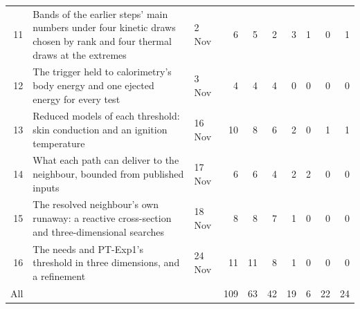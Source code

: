 \begin{table}[!htbp]
\begin{tabular}{rp{}lrrrrrrr}
11 & Bands of the earlier steps' main numbers under four kinetic draws chosen by rank and four thermal draws at the extremes & 2 Nov & 6 & 5 & 2 & 3 & 1 & 0 & 1 \\
12 & The trigger held to calorimetry's body energy and one ejected energy for every test & 3 Nov & 4 & 4 & 4 & 0 & 0 & 0 & 0 \\
13 & Reduced models of each threshold: skin conduction and an ignition temperature & 16 Nov & 10 & 8 & 6 & 2 & 0 & 1 & 1 \\
14 & What each path can deliver to the neighbour, bounded from published inputs & 17 Nov & 6 & 6 & 4 & 2 & 2 & 0 & 0 \\
15 & The resolved neighbour's own runaway: a reactive cross-section and three-dimensional searches & 18 Nov & 8 & 8 & 7 & 1 & 0 & 0 & 0 \\
16 & The needs and PT-Exp1's threshold in three dimensions, and a refinement & 24 Nov & 11 & 11 & 8 & 1 & 0 & 0 & 0 \\
\midrule
All & & & 109 & 63 & 42 & 19 & 6 & 22 & 24 \\
\bottomrule
\end{tabular}
\end{table}
